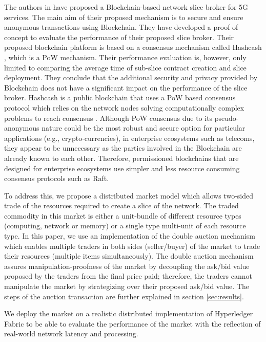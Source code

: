 The authors in \cite{8707070} have proposed a Blockchain-based network slice broker for 5G services. The main aim of their proposed mechanism is to secure and ensure anonymous transactions using Blockchain. They have developed a proof of concept to evaluate the performance of their proposed slice broker. Their proposed blockchain platform is based on a consensus mechanism called Hashcash \cite{hashcash}, which is a \ac{PoW} mechanism. Their performance evaluation is, however, only limited to comparing the average time of sub-slice contract creation and slice deployment. They conclude that the additional security and privacy provided by Blockchain does not have a significant impact on the performance of the slice broker. Hashcash is a public blockchain that uses a \ac{PoW} based consensus protocol which relies on the network nodes solving computationally complex problems to reach consensus \cite{8716424}. Although \ac{PoW} consensus due to its pseudo-anonymous nature could be the most robust and secure option for particular applications (e.g., crypto-currencies), in enterprise ecosystems such as telecoms, they appear to be unnecessary as the parties involved in the Blockchain are already known to each other. Therefore, permissioned blockchains that are designed for enterprise ecosystems use simpler and less resource consuming consensus protocols such as Raft. 

To address this, we propose a distributed market model which allows two-sided trade of the resources required to create a slice of the network. The traded commodity in this market is either a unit-bundle of different resource types (computing, network or memory) or a single type multi-unit of each resource type. 
In this paper, we use an implementation of the double auction mechanism \cite{8488596,8386208} which enables multiple traders in both sides (seller/buyer) of the market to trade their resources (multiple items simultaneously). The double auction mechanism assures manipulation-proofness of the market by decoupling the ask/bid value proposed by the traders from the final price paid; therefore, the traders cannot manipulate the market by strategizing over their proposed ask/bid value. The steps of the auction transaction are further explained in section \ref{sec:results}.

We deploy the market on a realistic distributed implementation of Hyperledger Fabric to be able to evaluate the performance of the market with the reflection of real-world network latency and processing. 

